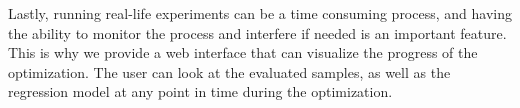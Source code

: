 Lastly, running real-life experiments can be a time consuming process, and
having the ability to monitor the process and interfere if needed is an
important feature. This is why we provide a web interface that can visualize
the progress of the optimization. The user can look at the evaluated samples,
as well as the regression model at any point in time during the optimization.



